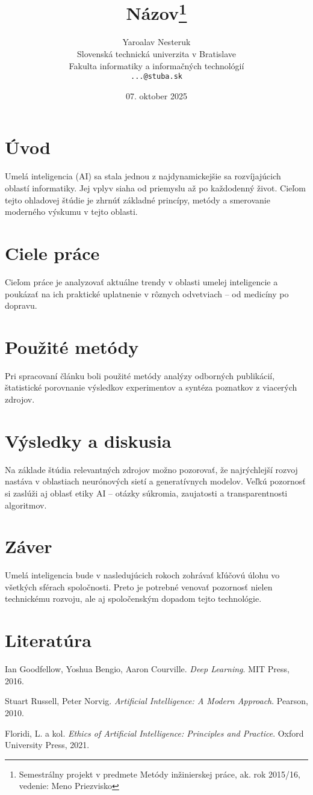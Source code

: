 \documentclass{coursepaper}
\title{Názov\thanks{Semestrálny projekt v predmete Metódy inžinierskej práce, ak. rok 2015/16, vedenie: Meno Priezvisko}}
\author{Yaroalav Nesteruk\\[2pt]
	{\small Slovenská technická univerzita v Bratislave}\\
	{\small Fakulta informatiky a informačných technológií}\\
	{\small \texttt{...@stuba.sk}}
	}
\date{\small 07. oktober 2025}
\begin{document}
\maketitle


\section{Úvod}
Umelá inteligencia (AI) sa stala jednou z najdynamickejšie sa rozvíjajúcich oblastí informatiky. Jej vplyv siaha od priemyslu až po každodenný život. Cieľom tejto ohladovej štúdie je zhrnúť základné princípy, metódy a smerovanie moderného výskumu v tejto oblasti.

\section{Ciele práce}
Cieľom práce je analyzovať aktuálne trendy v oblasti umelej inteligencie a poukázať na ich praktické uplatnenie v rôznych odvetviach – od medicíny po dopravu.

\section{Použité metódy}
Pri spracovaní článku boli použité metódy analýzy odborných publikácií, štatistické porovnanie výsledkov experimentov a syntéza poznatkov z viacerých zdrojov.

\section{Výsledky a diskusia}
Na základe štúdia relevantných zdrojov možno pozorovať, že najrýchlejší rozvoj nastáva v oblastiach neurónových sietí a generatívnych modelov. Veľkú pozornosť si zaslúži aj oblasť etiky AI – otázky súkromia, zaujatosti a transparentnosti algoritmov.

\section{Záver}
Umelá inteligencia bude v nasledujúcich rokoch zohrávať kľúčovú úlohu vo všetkých sférach spoločnosti. Preto je potrebné venovať pozornosť nielen technickému rozvoju, ale aj spoločenským dopadom tejto technológie.

\section{Literatúra}
\begin{thebibliography}{9}
Ian Goodfellow, Yoshua Bengio, Aaron Courville. \emph{Deep Learning}. MIT Press, 2016.

Stuart Russell, Peter Norvig. \emph{Artificial Intelligence: A Modern Approach}. Pearson, 2010.

Floridi, L. a kol. \emph{Ethics of Artificial Intelligence: Principles and Practice}. Oxford University Press, 2021.
\end{thebibliography}




\end{document}
